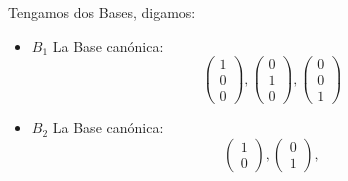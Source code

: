 \documentclass[12pt]{report}                                %
\begin{document}
            Tengamos dos Bases, digamos:
            \begin{itemize}
                \item $B_1$ La Base canónica:
                    \begin{equation*}
                        \begin{pmatrix} 1\\0\\0\end{pmatrix}, 
                        \begin{pmatrix} 0\\1\\0\end{pmatrix}, 
                        \begin{pmatrix} 0\\0\\1\end{pmatrix}
                    \end{equation*}

                \item $B_2$ La Base canónica:
                    \begin{equation*}
                        \begin{pmatrix} 1\\0\end{pmatrix}, 
                        \begin{pmatrix} 0\\1\end{pmatrix}, 
                    \end{equation*}
            \end{itemize}
\end{document}
